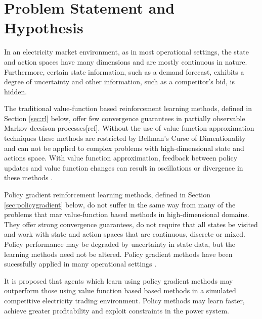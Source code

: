 \section{Problem Statement and Hypothesis}%
In an electricity market environment, as in most operational settings, the
state and action spaces have many dimensions and are mostly continuous in
nature. Furthermore, certain state information, such as a demand forecast,
exhibits a degree of uncertainty and other information, such as a competitor's
bid, is hidden.

The traditional value-function based reinforcement learning methods, defined
in Section \ref{sec:rl} below, offer few convergence guarantees in
partially observable Markov decsison processes[ref].  Without the use of value
function approximation techniques these methods are restricted by Bellman's
Curse of Dimentionality \cite{bellman:1961} and can not be applied to complex
problems with high-dimensional state and actions space.  With value function approximation, feedback between policy
updates and value function changes can result in oscillations or divergence in
these methods \cite{peters:enac}.

Policy gradient reinforcement learning methods, defined in Section
\ref{sec:policygradient} below, do not suffer in the same way from many of the
problems that mar value-function based methods in high-dimensional domains.
They offer strong convergence guarantees, do not require that all states be
visited and work with state and action spaces that are continuous, discrete or
mixed.  Policy performance may be degraded by uncertainty in state data, but
the learning methods need not be altered.  Policy gradient methods have been
sucessfully applied in many operational settings
\cite{barto:policy,shaal:robots,moody:direct,peshkin:routing}.

It is proposed that agents which learn using policy gradient methods may
outperform those using value function based based methods in a simulated
competitive electricity trading environment.  Policy methods may learn faster,
achieve greater profitability and exploit constraints in the power system.



